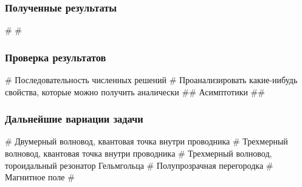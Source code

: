 \documentclass{beamer}
\begin{document}
\begin{frame}[fragile]
\frametitle{Полученные результаты}
\begin{easylist}[itemize]
# 
# 
\end{easylist}
\end{frame}


\begin{frame}[fragile]
\frametitle{Проверка результатов}
\begin{easylist}[itemize]
# Последовательность численных решений
# Проанализировать какие-нибудь свойства, которые можно получить аналически
## Асимптотики
## 
\end{easylist}
\end{frame}


\begin{frame}[fragile]
\frametitle{Дальнейшие вариации задачи}
\begin{easylist}[itemize]
# Двумерный волновод, квантовая точка внутри проводника
# Трехмерный волновод, квантовая точка внутри проводника
# Трехмерный волновод, тороидальный резонатор Гельмгольца 
# Полупрозрачная перегородка 
# Магнитное поле 
# 
\end{easylist}
\end{frame}
\end{document}
